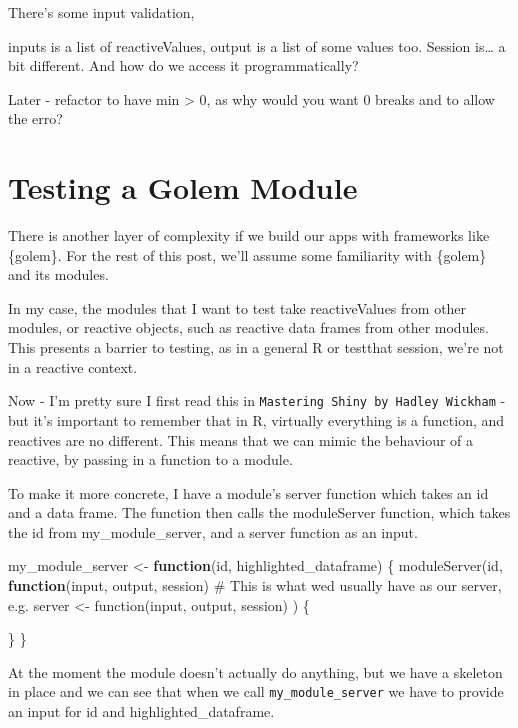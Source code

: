 \documentclass[
  letterpaper,
  DIV=11,
  numbers=noendperiod]{scrreprt}
\newenvironment{Shaded}{\begin{snugshade}}{\end{snugshade}}
\newcommand{\CommentTok}[1]{\textcolor[rgb]{0.37,0.37,0.37}{#1}}
\newcommand{\ControlFlowTok}[1]{\textcolor[rgb]{0.00,0.23,0.31}{\textbf{#1}}}
\newcommand{\FunctionTok}[1]{\textcolor[rgb]{0.28,0.35,0.67}{#1}}
\newcommand{\NormalTok}[1]{\textcolor[rgb]{0.00,0.23,0.31}{#1}}
\newcommand{\OtherTok}[1]{\textcolor[rgb]{0.00,0.23,0.31}{#1}}
\begin{document}
There's some input validation,

inputs is a list of reactiveValues, output is a list of some values too.
Session is\ldots{} a bit different. And how do we access it
programmatically?

Later - refactor to have min \textgreater{} 0, as why would you want 0
breaks and to allow the erro?

\chapter{Testing a Golem Module}\label{testing-a-golem-module}

There is another layer of complexity if we build our apps with
frameworks like \{golem\}. For the rest of this post, we'll assume some
familiarity with \{golem\} and its modules.

In my case, the modules that I want to test take reactiveValues from
other modules, or reactive objects, such as reactive data frames from
other modules. This presents a barrier to testing, as in a general R or
testthat session, we're not in a reactive context.

Now - I'm pretty sure I first read this in
\texttt{Mastering\ Shiny\ by\ Hadley\ Wickham} - but it's important to
remember that in R, virtually everything is a function, and reactives
are no different. This means that we can mimic the behaviour of a
reactive, by passing in a function to a module.

To make it more concrete, I have a module's server function which takes
an id and a data frame. The function then calls the moduleServer
function, which takes the id from my\_module\_server, and a server
function as an input.

\begin{Shaded}
\begin{Highlighting}[]
\NormalTok{my\_module\_server }\OtherTok{\textless{}{-}} \ControlFlowTok{function}\NormalTok{(id, highlighted\_dataframe) \{}
  \FunctionTok{moduleServer}\NormalTok{(id, }
               \ControlFlowTok{function}\NormalTok{(input, output, session) }\CommentTok{\# This is what we\textquotesingle{}d usually have as our server, e.g. server \textless{}{-} function(input, output, session)}
\NormalTok{  ) \{}
    
\NormalTok{  \} }
\NormalTok{\}}
\end{Highlighting}
\end{Shaded}

At the moment the module doesn't actually do anything, but we have a
skeleton in place and we can see that when we call
\texttt{my\_module\_server} we have to provide an input for id and
highlighted\_dataframe.
\end{document}
